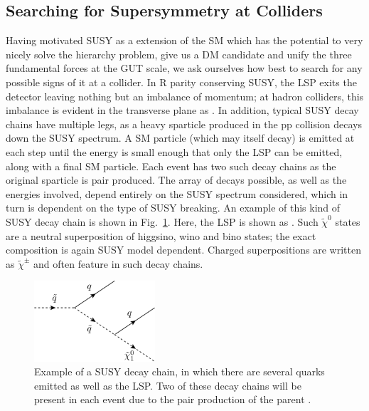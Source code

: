 \subsection{Searching for Supersymmetry at Colliders}
\label{sec:susycolliders}

Having motivated \ac{SUSY} as a extension of the \ac{SM} which has the potential to very nicely solve the hierarchy problem, give us a \ac{DM} candidate and unify the three fundamental forces at the \ac{GUT} scale, we ask ourselves how best to search for any possible signs of it at a collider.
In R parity conserving \ac{SUSY}, the \ac{LSP} exits the detector leaving nothing but an imbalance of momentum; at hadron colliders, this imbalance is evident in the transverse plane as \MET.
In addition, typical \ac{SUSY} decay chains have multiple legs, as a heavy sparticle produced in the pp collision decays down the \ac{SUSY} spectrum. 
A \ac{SM} particle (which may itself decay) is emitted at each step until the energy is small enough that only the \ac{LSP} can be emitted, along with a final \ac{SM} particle.
Each event has two such decay chains as the original sparticle is pair produced. 
The array of decays possible, as well as the energies involved, depend entirely on the \ac{SUSY} spectrum considered, which in turn is dependent on the type of \ac{SUSY} breaking.
An example of this kind of \ac{SUSY} decay chain is shown in Fig.~\ref{fig:SUSYdecaychain}. 
Here, the LSP is shown as \chiOneZero. 
Such $\tilde{\chi}^{0}$ states are a neutral superposition of higgsino, wino and bino states; the exact composition is again \ac{SUSY} model dependent.
Charged superpositions are written as $\tilde{\chi}^{\pm}$ and often feature in such decay chains.

\begin{figure}[htbp]
  \begin{center}
  \includegraphics[width=0.4\textwidth]{Figures/theory/susyDecayChain.pdf}
  \caption{Example of a \ac{SUSY} decay chain, in which there are several quarks emitted as well as the \ac{LSP}. Two of these decay chains will be present in each event due to the pair production of the parent \squark.}
   \label{fig:SUSYdecaychain}
   \end{center}
\end{figure}


